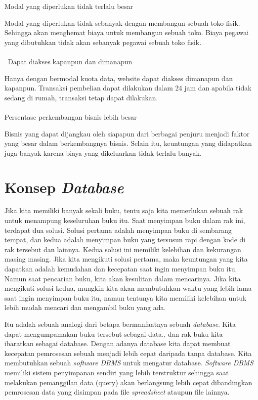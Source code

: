 Modal yang diperlukan tidak terlalu besar\\
\par Modal yang diperlukan tidak sebanyak dengan membangun sebuah toko fisik. Sehingga akan menghemat biaya untuk membangun sebuah toko. Biaya pegawai yang dibutuhkan tidak akan sebanyak pegawai sebuah toko fisik. \\\\\
Dapat diakses kapanpun dan dimanapun \\
\par Hanya dengan bermodal kuota data, website dapat diakses dimanapun dan kapanpun. Transaksi pembelian dapat dilakukan dalam 24 jam dan apabila tidak sedang di rumah, transaksi tetap dapat dilakukan. \\\\
Persentase perkembangan bisnis lebih besar \\
\par Bisnis yang dapat dijangkau oleh siapapun dari berbagai penjuru menjadi faktor yang besar dalam berkembangnya bisnis. Selain itu, keuntungan yang didapatkan juga banyak karena biaya yang dikeluarkan tidak terlalu banyak.

\section{Konsep \textit{Database}}
Jika kita memiliki banyak sekali buku, tentu saja kita memerlukan sebuah rak untuk menampung keseluruhan buku itu. Saat menyimpan buku dalam rak ini, terdapat dua solusi. Solusi pertama adalah menyimpan buku di sembarang tempat, dan kedua adalah menyimpan buku yang tersusun rapi dengan kode di rak tersebut dan lainnya. Kedua solusi ini memiliki kelebihan dan kekurangan masing masing. Jika kita mengikuti solusi pertama, maka keuntungan yang kita dapatkan adalah kemudahan dan kecepatan saat ingin menyimpan buku itu. Namun saat pencarian buku, kita akan kesulitan dalam mencarinya. Jika kita mengikuti solusi kedua, mungkin kita akan membutuhkan waktu yang lebih lama saat ingin menyimpan buku itu, namun tentunya kita memiliki kelebihan untuk lebih mudah mencari dan mengambil buku yang ada.
\par Itu adalah sebuah analogi dari betapa bermanfaatnya sebuah \textit{database}. Kita dapat mengumpamakan buku tersebut sebagai data., dan rak buku kita ibaratkan sebagai database. Dengan adanya database kita dapat membuat kecepatan pemrosesan sebuah menjadi lebih cepat daripada tanpa database. Kita membutuhkan sebuah \textit{software DBMS} untuk mengatur database. \textit{Software DBMS} memiliki sistem penyimpanan sendiri yang lebih terstruktur sehingga saat melakukan pemanggilan data (query) akan berlangsung lebih cepat dibandingkan pemrosesan data yang disimpan pada file \textit{spreadsheet} ataupun file lainnya.

